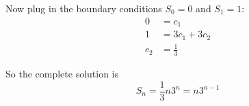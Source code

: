\documentclass[../main.tex]{subfiles}
\begin{document}
\begin{questions}
\begin{parts}
\begin{solution}
      Now plug in the boundary conditions $S_0=0$ and $S_1=1$:
      \begin{align*}
        0 &= c_1 \\
        1 &= 3c_1 + 3c_2 \\
        c_2 &= \frac{1}{3}
      \end{align*}

      So the complete solution is
      $$
      S_n = \frac{1}{3}n3^n = n3^{n-1}
      $$
    \end{solution}
  
  \end{parts}

\end{questions}
\end{document}

